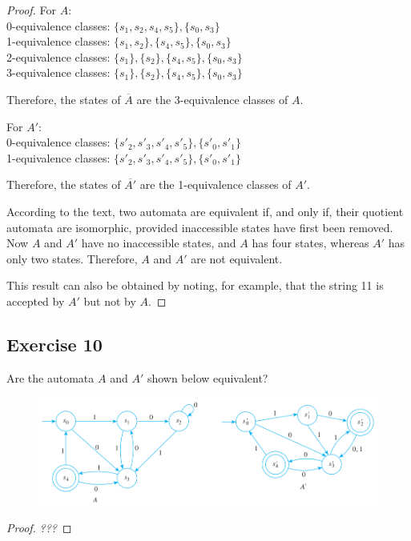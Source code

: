 \documentclass[14pt]{extarticle}
\begin{document}
\begin{proof}
For \(A\): \\
0-equivalence classes: \(\{s_1, s_2, s_4, s_5\}, \{s_0, s_3\}\) \\
1-equivalence classes: \(\{s_1, s_2\}, \{s_4, s_5\}, \{s_0, s_3\}\) \\
2-equivalence classes: \(\{s_1\}, \{s_2\}, \{s_4, s_5\}, \{s_0, s_3\}\) \\
3-equivalence classes: \(\{s_1\}, \{s_2\}, \{s_4, s_5\}, \{s_0, s_3\}\)

Therefore, the states of \(\overline{A}\) are the 3-equivalence classes of \(A\).

For \(A'\): \\
0-equivalence classes: \(\{s'_2, s'_3, s'_4, s'_5\}, \{s'_0, s'_1\}\) \\
1-equivalence classes: \(\{s'_2, s'_3, s'_4, s'_5\}, \{s'_0, s'_1\}\)

Therefore, the states of \(\overline{A'}\) are the 1-equivalence classes of \(A'\).

According to the text, two automata are equivalent if, and only if, their quotient automata are isomorphic, provided 
inaccessible states have first been removed. Now \(A\) and \(A'\) have no inaccessible states, and \(A\) has four states, 
whereas \(A'\) has only two states. Therefore, \(A\) and \(A'\) are not equivalent.

This result can also be obtained by noting, for example, that the string 11 is accepted by \(A'\) but not by \(A\).
\end{proof}

\subsection{Exercise 10}
Are the automata \(A\) and \(A'\) shown below equivalent?

\begin{figure}[ht!]
\centering
\includegraphics[scale=0.5]{../images/12.3.10.png}
\end{figure}

\begin{proof}
{\it ???}
\end{proof}
\end{document}
